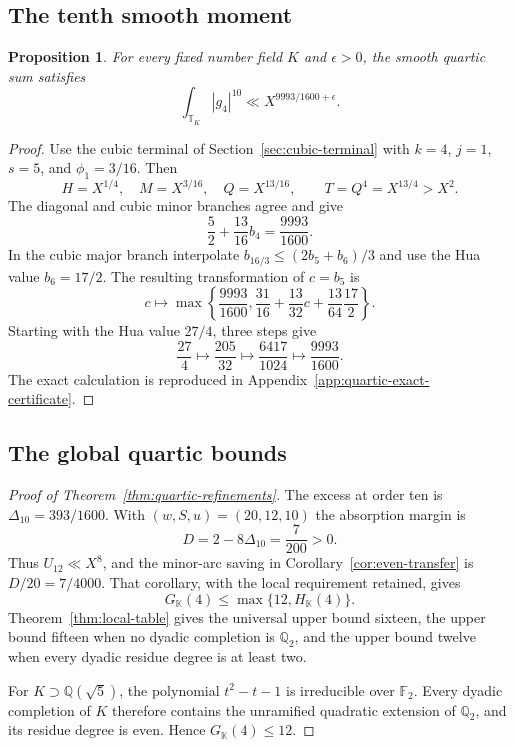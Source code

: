\documentclass[11pt]{amsart}
\newtheorem{proposition}[theorem]{Proposition}
\theoremstyle{definition}
\numberwithin{equation}{section}
\begin{document}
\subsection{The tenth smooth moment}
\begin{proposition}\label{prop:quartic-tenth}
For every fixed number field $K$ and $\epsilon>0$, the smooth
quartic sum satisfies
\begin{equation}\label{eq:q12-moment}
 \int_{\mathbb T_K}|g_4|^{10}\ll X^{9993/1600+\epsilon}.
\end{equation}
\end{proposition}
\begin{proof}
Use the cubic terminal of Section~\ref{sec:cubic-terminal} with
$k=4$, $j=1$, $s=5$, and $\phi_1=3/16$. Then
\[
 H=X^{1/4},\quad M=X^{3/16},\quad Q=X^{13/16},
 \qquad T=Q^4=X^{13/4}>X^2.
\]
The diagonal and cubic minor branches agree and give
\[
 \frac52+\frac{13}{16}b_4=\frac{9993}{1600}.
\]
In the cubic major branch interpolate
$b_{16/3}\le(2b_5+b_6)/3$ and use the Hua value $b_6=17/2$.
The resulting transformation of $c=b_5$ is
\[
 c\longmapsto\max\left\{\frac{9993}{1600},
       \frac{31}{16}+\frac{13}{32}c+
                           \frac{13}{64}\frac{17}{2}\right\}.
\]
Starting with the Hua value $27/4$, three steps give
\[
 \frac{27}{4}\longmapsto\frac{205}{32}
 \longmapsto\frac{6417}{1024}\longmapsto\frac{9993}{1600}.
\]
The exact calculation is reproduced in
Appendix~\ref{app:quartic-exact-certificate}.
\end{proof}

\subsection{The global quartic bounds}
\begin{proof}[Proof of Theorem~\ref{thm:quartic-refinements}]
The excess at order ten is $\Delta_{10}=393/1600$.
With $(w,S,u)=(20,12,10)$ the absorption margin is
\[
 D=2-8\Delta_{10}=\frac7{200}>0.
\]
Thus $U_{12}\ll X^8$, and the minor-arc saving in
Corollary~\ref{cor:even-transfer} is $D/20=7/4000$.
That corollary, with the local requirement retained, gives
\[
 G_{\mathbb K}(4)\le\max\{12,H_{\mathbb K}(4)\}.
\]
Theorem~\ref{thm:local-table} gives the universal upper bound
sixteen, the upper bound fifteen when no dyadic completion is
$\mathbb Q_2$, and the upper bound twelve when every dyadic residue
degree is at least two.

For $K\supset\mathbb Q(\sqrt5)$, the polynomial $t^2-t-1$ is
irreducible over $\mathbb F_2$. Every dyadic completion of $K$
therefore contains the unramified quadratic extension of
$\mathbb Q_2$, and its residue degree is even. Hence
$G_{\mathbb K}(4)\le12$.
\end{proof}
\end{document}
